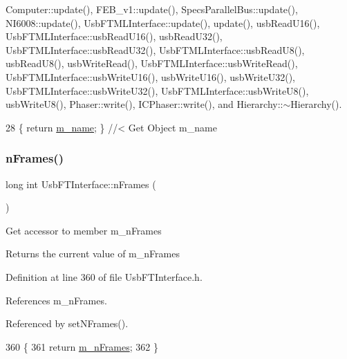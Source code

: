 Computer\+::update(), F\+E\+B\+\_\+v1\+::update(), Specs\+Parallel\+Bus\+::update(), N\+I6008\+::update(), Usb\+F\+T\+M\+L\+Interface\+::update(), update(), usb\+Read\+U16(), Usb\+F\+T\+M\+L\+Interface\+::usb\+Read\+U16(), usb\+Read\+U32(), Usb\+F\+T\+M\+L\+Interface\+::usb\+Read\+U32(), Usb\+F\+T\+M\+L\+Interface\+::usb\+Read\+U8(), usb\+Read\+U8(), usb\+Write\+Read(), Usb\+F\+T\+M\+L\+Interface\+::usb\+Write\+Read(), Usb\+F\+T\+M\+L\+Interface\+::usb\+Write\+U16(), usb\+Write\+U16(), usb\+Write\+U32(), Usb\+F\+T\+M\+L\+Interface\+::usb\+Write\+U32(), Usb\+F\+T\+M\+L\+Interface\+::usb\+Write\+U8(), usb\+Write\+U8(), Phaser\+::write(), I\+C\+Phaser\+::write(), and Hierarchy\+::$\sim$\+Hierarchy().


\begin{DoxyCode}
28 \{ \textcolor{keywordflow}{return} \hyperlink{classObject_a8b83c95c705d2c3ba0d081fe1710f48d}{m\_name}; \} \textcolor{comment}{//< Get Object m\_name}
\end{DoxyCode}
\mbox{\label{classUsbFTInterface_a694f5cb1d38d4369a597ad6761762c0e}} 
\subsubsection{\texorpdfstring{n\+Frames()}{nFrames()}}
{\footnotesize\ttfamily long int Usb\+F\+T\+Interface\+::n\+Frames (\begin{DoxyParamCaption}{ }\end{DoxyParamCaption})\hspace{0.3cm}{\ttfamily [inline]}}

Get accessor to member m\+\_\+n\+Frames \begin{DoxyReturn}{Returns}
the current value of m\+\_\+n\+Frames 
\end{DoxyReturn}


Definition at line 360 of file Usb\+F\+T\+Interface.\+h.



References m\+\_\+n\+Frames.



Referenced by set\+N\+Frames().


\begin{DoxyCode}
360                       \{
361     \textcolor{keywordflow}{return} \hyperlink{classUsbFTInterface_a40770504afc4173034c8a8d6c5f5962c}{m\_nFrames};
362   \}
\end{DoxyCode}
\mbox{\label{classHierarchy_ab16e84de65fd84e14001a6cf941c8be4}} 

